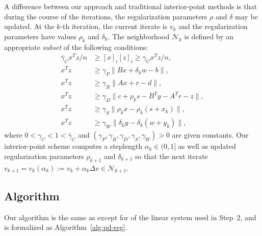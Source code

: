 \documentclass{amsart}
\begin{document}
A difference
between our approach and traditional interior-point methods is that during the
course of the iterations, the regularization parameters $\rho$ and $\delta$ may
be updated. At the $k$-th iteration, the current iterate is $v_k$ and the
regularization parameters have values $\rho_k$ and $\delta_k$. The neighborhood
$\mathcal{N}_k$ is defined by an appropriate \textit{subset} of the following
conditions:
\begin{subequations}
  \label{eq:neighborhood}
  \begin{align}
    \bar{\gamma}_C x^T z / n & \geq [x]_i [z]_i \geq \gamma_C x^T z / n,
    \label{eq:centrality} \\
    x^T z & \geq \gamma_P \|Bx + \delta_k w - b\|, \label{eq:pFeas} \\
    x^T z & \geq \gamma_R \|Ax + r - d\|, \label{eq:lsqFeas} \\
    x^T z & \geq \gamma_D \|c + \rho_k s - B^T y - A^T r - z\|,
    \label{eq:dFeas} \\
    x^T z & \geq \gamma_S \|\rho_k x - \rho_k(s + x_k)\|, \label{eq:sx} \\
    x^T z & \geq \gamma_W \|\delta_k y - \delta_k (w + y_k)\|,
    \label{eq:yw}
\end{align}
\end{subequations}
where $0 < \gamma_C < 1 < \bar{\gamma}_C$ and $(\gamma_P, \gamma_R, \gamma_D,
\gamma_S,\gamma_W) > 0$ are given constants. Our interior-point scheme computes
a steplength $\alpha_k \in (0,1]$ as well as updated regularization parameters
$\rho_{k+1}$ and $\delta_{k+1}$ so that the next iterate $v_{k+1} =
v_k(\alpha_k) := v_k + \alpha_k \Delta v \in \mathcal{N}_{k+1}$.

\subsection{Algorithm}

Our algorithm is the same as \cite[Algorithm~$4.1$]{friedlander-orban-2012}
except for of the linear system used in Step~$2$, and is formalized as
Algorithm~\ref{alg:pd-reg}.
\end{document}
